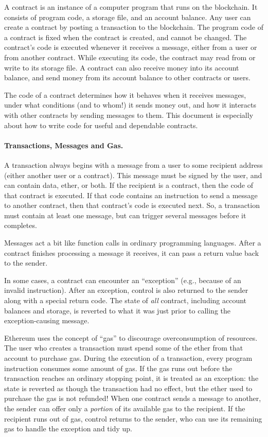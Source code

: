 \documentclass[10pt,twocolumn,letterpaper]{article}
\begin{document}
A contract is an instance of a computer program that runs on the blockchain. It consists of program code, a storage file, and an account balance.
Any user can create a contract by posting a transaction to the blockchain.
The program code of a contract is fixed when the contract is created, and cannot be changed.
The contract's code is executed whenever it receives a message, either from a user or from another contract.
While executing its code, the contract may read from or write to its storage file.
A contract can also receive money into its account balance, and send money from its account balance to other contracts or users.

The code of a contract determines how it behaves when it receives messages, under what conditions (and to whom!) it sends  money out, and how it interacts with other contracts by sending messages to them. This document is especially about how to write code for useful and dependable contracts.

\paragraph{Transactions, Messages and Gas.}
A transaction always begins with a message from a user to some recipient address (either another user or a contract). This message must be signed by the user, and can contain data, ether, or both. If the recipient is a contract, then the code of that contract is executed. If that code contains an instruction to send a message to another contract, then that contract's code is executed next. So, a transaction must contain at least one message, but can trigger several messages before it completes.

Messages act a bit like function calls in ordinary programming languages. After a contract finishes processing a message it receives, it can pass a return value back to the sender.

In some cases, a contract can encounter an ``exception'' (e.g., because of an invalid instruction). After an exception, control is also returned to the sender along with a special return code. The state of \emph{all} contract, including account balances and storage, is reverted to what it was just prior to calling the exception-causing message.

Ethereum uses the concept of ``gas'' to discourage overconsumption of resources. The user who creates a transaction must spend some of the ether from that account to purchase gas. During the execution of a transaction, every program instruction consumes some amount of gas. If the gas runs out before the transaction reaches an ordinary stopping point, it is treated as an exception: the state is reverted as though the transaction had no effect, but the ether used to purchase the gas is not refunded! When one contract sends a message to another, the sender can offer only a \emph{portion} of its available gas to the recipient. If the recipient runs out of gas, control returns to the sender, who can use its remaining gas to handle the exception and tidy up.
\end{document}
